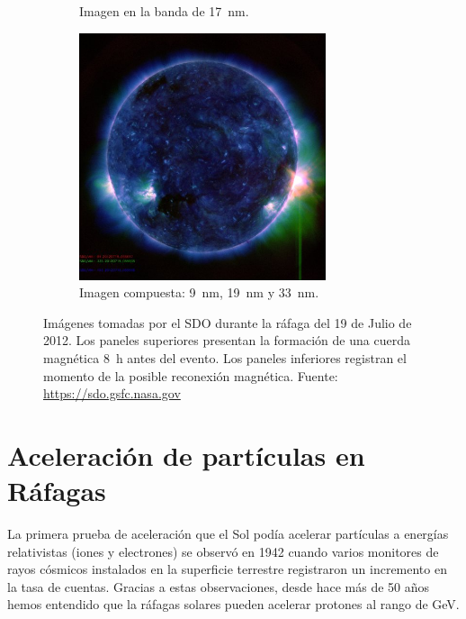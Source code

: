 \begin{figure}
\begin{subfigure}[b]{0.49\textwidth}
                \caption*{Imagen en la banda de \SI{17}{\nano\metre}.}
        \end{subfigure}
        \begin{subfigure}[b]{0.49\textwidth}
                \includegraphics[width=7.25cm]{sdo120719-0555-c}
                \caption*{Imagen compuesta: \SI{9}{\nano\metre}, \SI{19}{\nano\metre} y \SI{33}{\nano\metre}.}
        \end{subfigure}
        \caption{Imágenes tomadas por el SDO durante la ráfaga del \num{19} de Julio de \num{2012}. Los paneles superiores presentan la formación de una cuerda magnética \SI{8}{\hour} antes del evento. Los paneles inferiores registran el momento de la posible reconexión magnética. Fuente: \url{https://sdo.gsfc.nasa.gov}}
        \label{fig:flare-euv}
\end{figure}

\section{Aceleración de partículas en Ráfagas}

La primera prueba de aceleración que el Sol podía acelerar partículas a energías relativistas (iones y electrones) se observó en \num{1942} cuando varios monitores de rayos cósmicos instalados en la superficie terrestre registraron un incremento en la tasa de cuentas. Gracias a estas observaciones, desde hace más de \num{50} años hemos entendido que la ráfagas solares pueden acelerar protones al rango de \si{\giga\electronvolt}.


